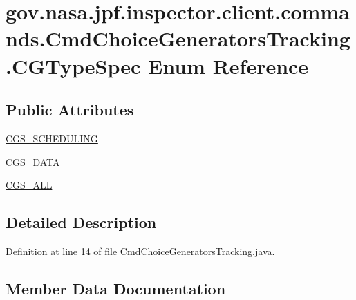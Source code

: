 \hypertarget{enumgov_1_1nasa_1_1jpf_1_1inspector_1_1client_1_1commands_1_1_cmd_choice_generators_tracking_1_1_c_g_type_spec}{}\section{gov.\+nasa.\+jpf.\+inspector.\+client.\+commands.\+Cmd\+Choice\+Generators\+Tracking.\+C\+G\+Type\+Spec Enum Reference}
\label{enumgov_1_1nasa_1_1jpf_1_1inspector_1_1client_1_1commands_1_1_cmd_choice_generators_tracking_1_1_c_g_type_spec}
\subsection*{Public Attributes}
\begin{DoxyCompactItemize}
\item 
\hyperlink{enumgov_1_1nasa_1_1jpf_1_1inspector_1_1client_1_1commands_1_1_cmd_choice_generators_tracking_1_1_c_g_type_spec_a2da4a867a8c86c91b44b4eab39778d57}{C\+G\+S\+\_\+\+S\+C\+H\+E\+D\+U\+L\+I\+NG}
\item 
\hyperlink{enumgov_1_1nasa_1_1jpf_1_1inspector_1_1client_1_1commands_1_1_cmd_choice_generators_tracking_1_1_c_g_type_spec_ab9447a1522bae9b62a98bb30611c2165}{C\+G\+S\+\_\+\+D\+A\+TA}
\item 
\hyperlink{enumgov_1_1nasa_1_1jpf_1_1inspector_1_1client_1_1commands_1_1_cmd_choice_generators_tracking_1_1_c_g_type_spec_abb58d4a840a0a78d5ef028cf1326145d}{C\+G\+S\+\_\+\+A\+LL}
\end{DoxyCompactItemize}


\subsection{Detailed Description}


Definition at line 14 of file Cmd\+Choice\+Generators\+Tracking.\+java.



\subsection{Member Data Documentation}
